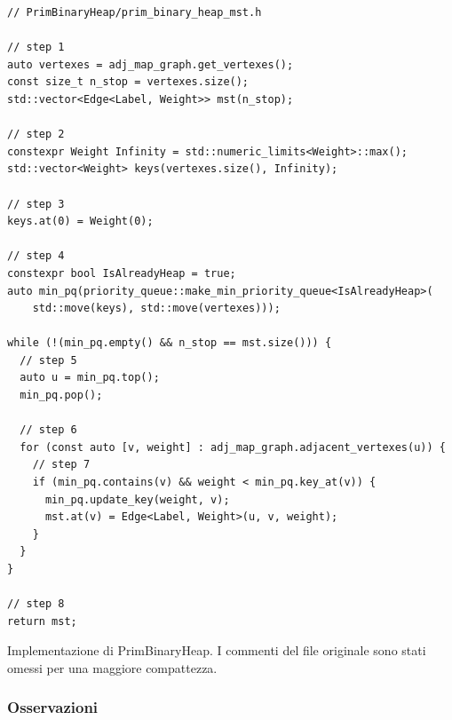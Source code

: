 \begin{listing}[!hb]
\begin{verbatim}
// PrimBinaryHeap/prim_binary_heap_mst.h

// step 1
auto vertexes = adj_map_graph.get_vertexes();
const size_t n_stop = vertexes.size();
std::vector<Edge<Label, Weight>> mst(n_stop);

// step 2
constexpr Weight Infinity = std::numeric_limits<Weight>::max();
std::vector<Weight> keys(vertexes.size(), Infinity);

// step 3
keys.at(0) = Weight(0);

// step 4
constexpr bool IsAlreadyHeap = true;
auto min_pq(priority_queue::make_min_priority_queue<IsAlreadyHeap>(
    std::move(keys), std::move(vertexes)));

while (!(min_pq.empty() && n_stop == mst.size())) {
  // step 5
  auto u = min_pq.top();
  min_pq.pop();

  // step 6
  for (const auto [v, weight] : adj_map_graph.adjacent_vertexes(u)) {
    // step 7
    if (min_pq.contains(v) && weight < min_pq.key_at(v)) {
      min_pq.update_key(weight, v);
      mst.at(v) = Edge<Label, Weight>(u, v, weight);
    }
  }
}

// step 8
return mst;
\end{verbatim}
\caption{Implementazione di PrimBinaryHeap. I commenti del file originale sono stati omessi per una maggiore compattezza.}
\label{listing:prim-binary-heap}
\end{listing}

\subsubsection{Osservazioni}

